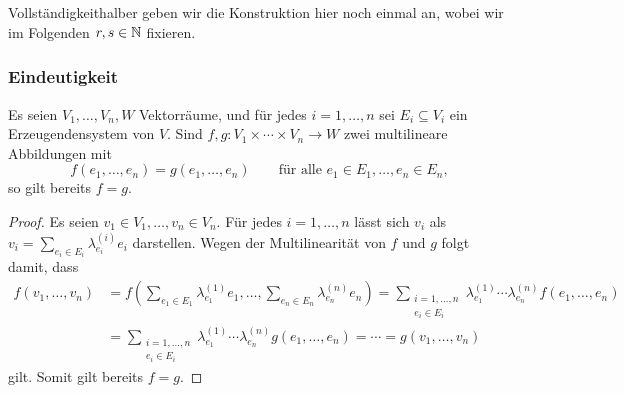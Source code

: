 \section{}





\subsection{}
Vollständigkeithalber geben wir die Konstruktion hier noch einmal an, wobei wir im Folgenden $r, s \in \mathbb{N}$ fixieren.



\subsubsection{Eindeutigkeit}

\begin{lemma}
  \label{lemma: multilinear maps are uniquely determined by generating sets}
  Es seien $V_1, \dotsc, V_n, W$ Vektorräume, und für jedes $i = 1, \dotsc, n$ sei $E_i \subseteq V_i$ ein Erzeugendensystem von $V$.
  Sind $f, g \colon V_1 \times \dotsb \times V_n \to W$ zwei multilineare Abbildungen mit
  \[
      f( e_1, \dotsc, e_n )
    = g( e_1, \dotsc, e_n)
    \qquad
    \text{für alle $e_1 \in E_1, \dotsc, e_n \in E_n$},
  \]
  so gilt bereits $f = g$.
\end{lemma}

\begin{proof}
  Es seien $v_1 \in V_1, \dotsc, v_n \in V_n$.
  Für jedes $i = 1, \dotsc, n$ lässt sich $v_i$ als $v_i = \sum_{e_i \in E_i} \lambda^{(i)}_{e_i} e_i$ darstellen.
  Wegen der Multilinearität von $f$ und $g$ folgt damit, dass
  \begin{align*}
        f(v_1, \dotsc, v_n)
    &=  f\left( \sum_{e_1 \in E_1} \lambda^{(1)}_{e_1} e_1, \dotsc, \sum_{e_n \in E_n} \lambda^{(n)}_{e_n} e_n \right)
     =  \sum_{\substack{i = 1, \dotsc, n \\ e_i \in E_i}} \lambda^{(1)}_{e_1} \dotsm \lambda^{(n)}_{e_n} f(e_1, \dotsc, e_n)
    \\
    &=  \sum_{\substack{i = 1, \dotsc, n \\ e_i \in E_i}} \lambda^{(1)}_{e_1} \dotsm \lambda^{(n)}_{e_n} g(e_1, \dotsc, e_n)
     =  \dotsb
     =  g(v_1, \dotsc, v_n)
  \end{align*}
  gilt.
  Somit gilt bereits $f = g$.
\end{proof}


